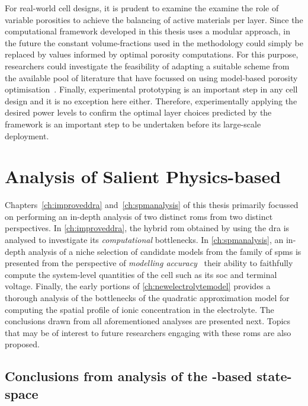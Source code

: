 For  real-world cell  designs, it  is prudent  to examine  the examine  the role
of  variable  porosities  to  achieve  the balancing  of  active  materials  per
layer.  Since  the computational  framework  developed  in  this thesis  uses  a
modular  approach, in  the  future  the constant  volume-fractions  used in  the
methodology  could simply  be replaced  by values  informed by  optimal porosity
computations. For this purpose, researchers could investigate the feasibility of
adapting  a suitable  scheme from  the available  pool of  literature that  have
focussed  on  using  model-based  porosity  optimisation~\cite{Xue2013,Xue2014a,
Christensen2006}. Finally, experimental prototyping is  an important step in any
cell  design and  it  is  no exception  here  either. Therefore,  experimentally
applying the desired power levels to confirm the optimal layer choices predicted
by the  framework is an important  step to be undertaken  before its large-scale
deployment.

\section{Analysis of Salient Physics-based }

Chapters~\ref{ch:improveddra} and~\ref{ch:spmanalysis} of  this thesis primarily
focussed on performing an in-depth analysis of two distinct \glspl{rom} from two
distinct perspectives.  In \cref{ch:improveddra}, the hybrid  \gls{rom} obtained
by  using the  \gls{dra}  is analysed  to  investigate its  \emph{computational}
bottlenecks. In \cref{ch:spmanalysis}, an in-depth analysis of a niche selection
of  candidate models  from  the  family of  \glspl{spm}  is  presented from  the
perspective of \emph{modelling accuracy} \ie~their ability to faithfully compute
the  system-level quantities  of the  cell such  as its  \gls{soc} and  terminal
voltage. Finally, the early portions of \cref{ch:newelectrolytemodel} provides a
thorough analysis  of the bottlenecks  of the quadratic approximation  model for
computing the  spatial profile  of ionic concentration  in the  electrolyte. The
conclusions drawn  from all aforementioned  analyses are presented  next. Topics
that may  be of interest to  future researchers engaging with  these \glspl{rom}
are also proposed.

\subsection{Conclusions from analysis of the -based state-space }

